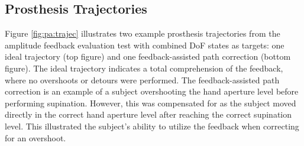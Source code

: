 
\subsection{Prosthesis Trajectories}

Figure \ref{fig:pa:trajec} illustrates two example prosthesis trajectories from the amplitude feedback evaluation test with combined DoF states as targets: one ideal trajectory (top figure) and one feedback-assisted path correction (bottom figure). The ideal trajectory indicates a total comprehension of the feedback, where no overshoots or detours were performed. The feedback-assisted path correction is an example of a subject overshooting the hand aperture level before performing supination. However, this was compensated for as the subject moved directly in the correct hand aperture level after reaching the correct supination level. This illustrated the subject's ability to utilize the feedback when correcting for an overshoot. 

